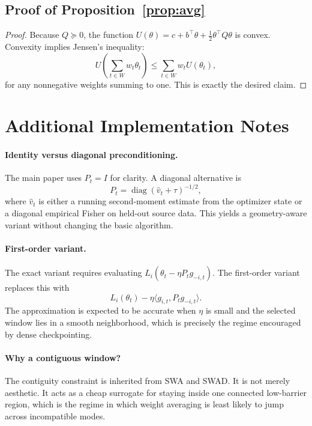 \documentclass{article}
\newcommand{\diag}{\operatorname{diag}}
\newcommand{\swad}{\textup{\textsc{SWAD}}}
\begin{document}
\subsection{Proof of Proposition~\ref{prop:avg}}

\begin{proof}
Because $Q \succeq 0$, the function $U(\theta)=c+b^\top\theta+\frac{1}{2}\theta^\top Q\theta$ is convex. Convexity implies Jensen's inequality:
\begin{equation}
    U\!\left(\sum_{t\in W} w_t \theta_t\right)
    \le
    \sum_{t\in W} w_t U(\theta_t),
\end{equation}
for any nonnegative weights summing to one. This is exactly the desired claim.
\end{proof}

\section{Additional Implementation Notes}

\paragraph{Identity versus diagonal preconditioning.}
The main paper uses $P_t=I$ for clarity. A diagonal alternative is
\begin{equation}
    P_t = \diag(\hat v_t + \tau)^{-1/2},
\end{equation}
where $\hat v_t$ is either a running second-moment estimate from the optimizer state or a diagonal empirical Fisher on held-out source data. This yields a geometry-aware variant without changing the basic algorithm.

\paragraph{First-order variant.}
The exact variant requires evaluating $L_i(\theta_t - \eta P_t g_{-i,t})$. The first-order variant replaces this with
\begin{equation}
    L_i(\theta_t) - \eta \langle g_{i,t}, P_t g_{-i,t}\rangle.
\end{equation}
The approximation is expected to be accurate when $\eta$ is small and the selected window lies in a smooth neighborhood, which is precisely the regime encouraged by dense checkpointing.

\paragraph{Why a contiguous window?}
The contiguity constraint is inherited from SWA and \swad{}. It is not merely aesthetic. It acts as a cheap surrogate for staying inside one connected low-barrier region, which is the regime in which weight averaging is least likely to jump across incompatible modes.
\end{document}
